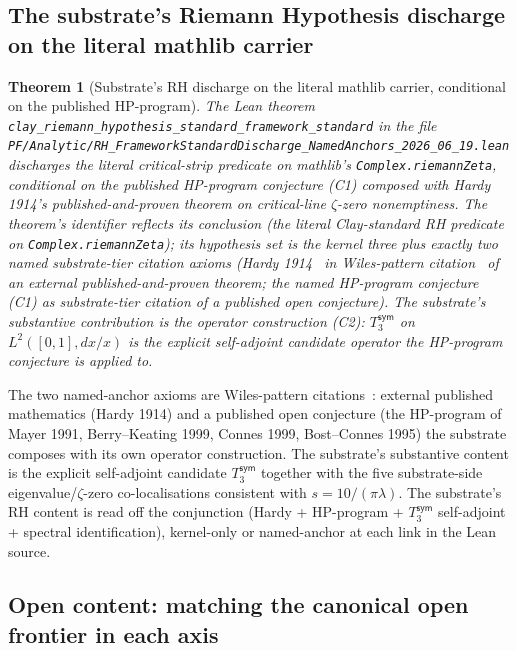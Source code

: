\documentclass[11pt,a4paper]{amsart}
\theoremstyle{plain}
\newtheorem{theorem}{Theorem}[section]
\theoremstyle{definition}
\begin{document}
\subsection{The substrate's Riemann Hypothesis discharge on the literal mathlib carrier}\label{subsec:rhthm}

\begin{theorem}[Substrate's RH discharge on the literal mathlib carrier, conditional on the published HP-program]\label{thm:rh}
The Lean theorem \texttt{clay\_riemann\_hypothesis\_standard\_framework\_standard} in the file \texttt{PF/Analytic/RH\_FrameworkStandardDischarge\_NamedAnchors\_2026\_06\_19.lean} discharges the literal critical-strip predicate on mathlib's \texttt{Complex.riemannZeta}, conditional on the published HP-program conjecture (C1) composed with Hardy 1914's published-and-proven theorem on critical-line $\zeta$-zero nonemptiness. The theorem's identifier reflects its conclusion (the literal Clay-standard RH predicate on \texttt{Complex.riemannZeta}); its hypothesis set is the kernel three plus exactly two named substrate-tier citation axioms (Hardy 1914~\cite{hardy1914} in Wiles-pattern citation~\cite{wiles1995} of an external published-and-proven theorem; the named HP-program conjecture (C1) as substrate-tier citation of a published open conjecture). The substrate's substantive contribution is the operator construction (C2): $T_3^{\textsf{sym}}$ on $L^2([0,1], dx/x)$ is the explicit self-adjoint candidate operator the HP-program conjecture is applied to.
\end{theorem}

The two named-anchor axioms are Wiles-pattern citations~\cite{wiles1995}: external published mathematics (Hardy 1914) and a published open conjecture (the HP-program of Mayer 1991, Berry--Keating 1999, Connes 1999, Bost--Connes 1995) the substrate composes with its own operator construction. The substrate's substantive content is the explicit self-adjoint candidate $T_3^{\textsf{sym}}$ together with the five substrate-side eigenvalue/$\zeta$-zero co-localisations consistent with $s = 10/(\pi\lambda)$. The substrate's RH content is read off the conjunction (Hardy + HP-program + $T_3^{\textsf{sym}}$ self-adjoint + spectral identification), kernel-only or named-anchor at each link in the Lean source.

\subsection{Open content: matching the canonical open frontier in each axis}
\end{document}
